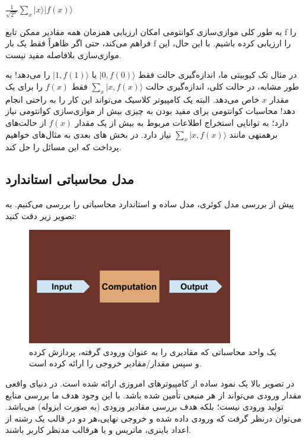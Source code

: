 \documentclass{book}
\begin{document}
\begin{center}
	$\frac{1}{\sqrt{2^n}} \sum_{x} \vert x \rangle \vert f (x)\rangle$ 
\end{center}


به طور کلی موازی‌سازی کوانتومی امکان ارزیابی همزمان همه مقادیر ممکن تابع f را فراهم می‌کند، حتی اگر ظاهراً فقط یک بار f را ارزیابی کرده باشیم. با این حال، این موازی‌سازی بلافاصله مفید نیست. 

در مثال تک کیوبیتی ما، اندازه‌گیری حالت فقط $\vert 0, f(0)\rangle$ یا $\vert 1, f(1)\rangle$ را می‌دهد! به طور مشابه، در حالت کلی، اندازه‌گیری حالت $\sum_{x} \vert x, f(x) \rangle$ فقط $ f (x)$ را برای یک مقدار $x$ خاص می‌دهد. البته یک کامپیوتر کلاسیک می‌تواند این کار را به راحتی انجام دهد! محاسبات کوانتومی برای مفید بودن به چیزی بیش از موازی‌سازی کوانتومی نیاز دارد؛ به توانایی استخراج اطلاعات مربوط به بیش از یک مقدار $f (x)$ از حالت‌های برهمنهی مانند $\sum _{x}\vert x, f(x) \rangle$ نیاز دارد. 
در بخش های بعدی به مثال‌های خواهیم پرداخت که این مسائل را حل کند.
\subsection{مدل محاسباتی استاندارد}
پیش از بررسی مدل کوئری،‌ مدل ساده و استاندارد محاسباتی را بررسی می‌کنیم. به تصویر زیر دقت کنید:

\begin{figure}[ht]
	\centering
	\includegraphics[width=0.8\textwidth]{standard computation model.png}
	\caption{یک واحد محاسباتی که مقادیری را به عنوان ورودی گرفته، پردازش کرده و سپس مقدار/مقادیر خروجی را ارائه کرده است.}
\end{figure}


در تصویر بالا یک نمود ساده از کامپیوتر‌های امروزی ارائه شده است. در دنیای واقعی مقدار ورودی می‌تواند از هر منبعی‌ تأمین شده باشد. با این وجود هدف ما بررسی منابع تولید ورودی نیست؛‌ بلکه هدف بررسی مقادیر ورودی (به صورت ایزوله) می‌باشد. می‌توان درنظر گرفت که ورودی داده شده و خروجی نهایی،‌هر دو در قالب یک رشته از اعداد باینری، ماتریس و یا هرقالب مدنظر کاربر باشند.
\end{document}
